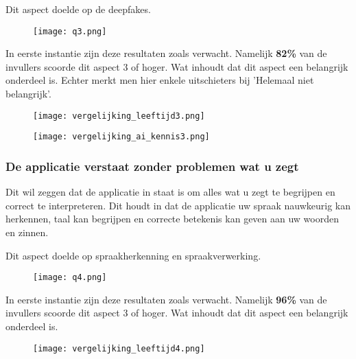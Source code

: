 Dit aspect doelde op de deepfakes.

\begin{figure}[htbp]
    \centering
    \texttt{[image: q3.png]}
    \label{fig:vraag_3_resultaat}
\end{figure}

In eerste instantie zijn deze resultaten zoals verwacht. Namelijk \textbf{82\%} van de invullers scoorde dit aspect 3 of hoger. Wat inhoudt dat dit aspect een belangrijk onderdeel is. Echter merkt men hier enkele uitschieters bij 'Helemaal niet belangrijk'.

\begin{figure}[htbp]
    \centering
    \texttt{[image: vergelijking\_leeftijd3.png]}
    \label{fig:vergelijking_leeftijd3}
\end{figure}

\begin{figure}[htbp]
    \centering
    \texttt{[image: vergelijking\_ai\_kennis3.png]}
    \label{fig:vergelijking_ai_kennis3}
\end{figure}

\newpage

\subsubsection{De applicatie verstaat zonder problemen wat u zegt}

Dit wil zeggen dat de applicatie in staat is om alles wat u zegt te begrijpen en correct te interpreteren. Dit houdt in dat de applicatie uw spraak nauwkeurig kan herkennen, taal kan begrijpen en correcte betekenis kan geven aan uw woorden en zinnen.

Dit aspect doelde op spraakherkenning en spraakverwerking.

\begin{figure}[htbp]
    \centering
    \texttt{[image: q4.png]}
    \label{fig:vraag_4_resultaat}
\end{figure}

In eerste instantie zijn deze resultaten zoals verwacht. Namelijk \textbf{96\%} van de invullers scoorde dit aspect 3 of hoger. Wat inhoudt dat dit aspect een belangrijk onderdeel is.

\begin{figure}[htbp]
    \centering
    \texttt{[image: vergelijking\_leeftijd4.png]}
    \label{fig:vergelijking_leeftijd4}
\end{figure}

